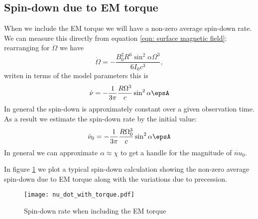 \documentclass[/home/greg/Thesis/main/main.tex]{subfiles}
\begin{document}
\subsection{Spin-down due to EM torque}
When we include the EM torque we will have a non-zero average spin-down rate. 
We can measure this directly from equation \eqref{eqn: surface magnetic field}:
rearranging for $\dot{\Omega}$ we have
\begin{equation}
    \dot{\Omega} = -\frac{B_{0}^{2}R^{6} \sin^{2}\alpha \Omega^{3}}{6I_{0}c^{3}},
\end{equation}
writen in terms of the model parameters this is
\begin{equation}
\dot{\nu} = -\frac{1}{3\pi}\frac{R \Omega^{3}}{c} \sin^{2}\alpha \epsA
\end{equation}
In general the spin-down is approximately constant over a given observation
time. As a result we estimate the spin-down rate by the initial value:
\begin{equation}
    \dot{\nu}_{0} = -\frac{1}{3\pi}\frac{R \Omega_{0}^{3}}{c} \sin^{2}\alpha \epsA
    \label{eqn: spin-down initial EM}
\end{equation}
In general we can approximate $\alpha\approx\chi$ to get a handle for the 
magnitude of $\dot{nu}_{0}$.

In figure \ref{fig: nu_dot with torque} we plot a typical spin-down calculation
showing the non-zero average spin-down due to EM torque along with the 
variations due to precession.
\begin{figure}[ht]
\centering
	\texttt{[image: nu\_dot\_with\_torque.pdf]}
\caption{Spin-down rate when including the EM torque}
\label{fig: nu_dot with torque}
\end{figure}
\end{document}
